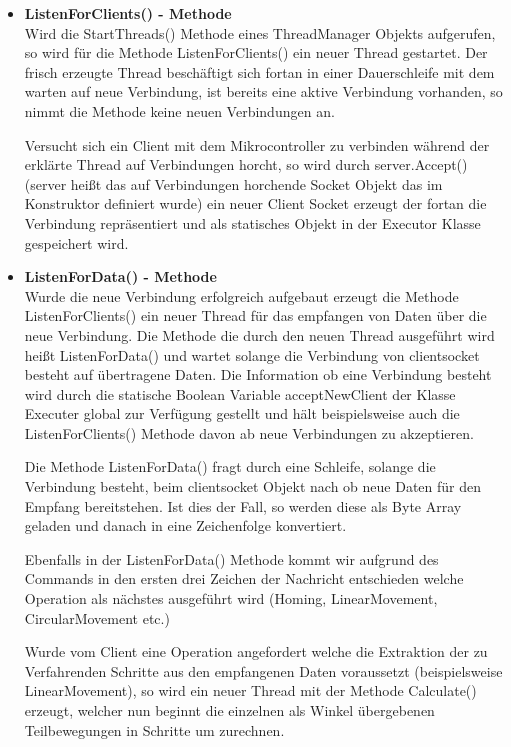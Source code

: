 \begin{itemize}
\item \textbf{ListenForClients() - Methode}\\
Wird die StartThreads() Methode eines ThreadManager Objekts aufgerufen, so wird für die Methode ListenForClients() ein neuer Thread gestartet. Der frisch erzeugte Thread beschäftigt sich fortan in einer Dauerschleife mit dem warten auf neue Verbindung, ist bereits eine aktive Verbindung vorhanden, so nimmt die Methode keine neuen Verbindungen an.

Versucht sich ein Client mit dem Mikrocontroller zu verbinden während der erklärte Thread auf Verbindungen horcht, so wird durch server.Accept() (server heißt das auf Verbindungen horchende Socket Objekt das im Konstruktor definiert wurde) ein neuer Client Socket erzeugt der fortan die Verbindung repräsentiert und als statisches Objekt in der Executor Klasse gespeichert wird.

\item \textbf{ListenForData() - Methode}\\
Wurde die neue Verbindung erfolgreich aufgebaut erzeugt die Methode ListenForClients() ein neuer Thread für das empfangen von Daten über die neue Verbindung. Die Methode die durch den neuen Thread ausgeführt wird heißt ListenForData() und wartet solange die Verbindung von clientsocket besteht auf übertragene Daten. 
Die Information ob eine Verbindung besteht wird durch die statische Boolean Variable acceptNewClient der Klasse Executer global zur Verfügung gestellt und hält beispielsweise auch die ListenForClients() Methode davon ab neue Verbindungen zu akzeptieren.

Die Methode ListenForData() fragt durch eine Schleife, solange die Verbindung besteht, beim clientsocket Objekt nach ob neue Daten für den Empfang bereitstehen. Ist dies der Fall, so werden diese als Byte Array geladen und danach in eine Zeichenfolge konvertiert.

Ebenfalls in der ListenForData() Methode kommt wir aufgrund des Commands in den ersten drei Zeichen der Nachricht entschieden welche Operation als nächstes ausgeführt wird (Homing, LinearMovement, CircularMovement etc.)

Wurde vom Client eine Operation angefordert welche die Extraktion der zu Verfahrenden Schritte aus den empfangenen Daten voraussetzt (beispielsweise LinearMovement), so wird ein neuer Thread mit der Methode Calculate() erzeugt, welcher nun beginnt die einzelnen als Winkel übergebenen Teilbewegungen in Schritte um zurechnen.


\end{itemize}
